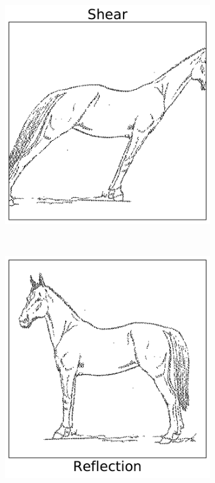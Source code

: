 \begin{figure}[h]
\begin{subfigure}{.32\textwidth}
\end{subfigure}
%
\begin{subfigure}{.32\textwidth}
    \centering
    \includegraphics[width=\linewidth]{ShearHorse.pdf}
\end{subfigure}
\\
\begin{subfigure}{.32\textwidth}
    \centering
    \includegraphics[width=\linewidth]{ReflectionHorse.pdf}

\end{subfigure}
\end{figure}
